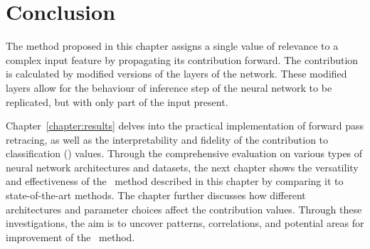 \section{Conclusion}

The method proposed in this chapter assigns a single value of relevance to a complex input feature by propagating its contribution forward. The contribution is calculated by modified versions of the layers of the network. These modified layers allow for the behaviour of inference step of the neural network to be replicated, but with only part of the input present. 

Chapter~\ref{chapter:results} delves into the practical implementation of forward pass retracing, as well as the interpretability and fidelity of the contribution to classification (\CTC\/) values. Through the comprehensive evaluation on various types of neural network architectures and datasets, the next chapter shows the versatility and effectiveness of the \CTC\ method described in this chapter by comparing it to state-of-the-art methods. The chapter further discusses how different architectures and parameter choices affect the contribution values. Through these investigations, the aim is to uncover patterns, correlations, and potential areas for improvement of the \CTC\ method.